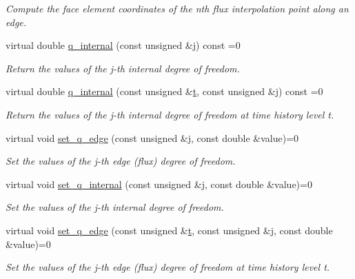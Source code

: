 \begin{DoxyCompactItemize}
\begin{DoxyCompactList}\small\item\em Compute the face element coordinates of the nth flux interpolation point along an edge. \end{DoxyCompactList}\item 
virtual double \hyperlink{classoomph_1_1AxisymmetricPoroelasticityEquations_aa8e09704efd83dcc29b6d10c7d67fd0a}{q\+\_\+internal} (const unsigned \&j) const =0
\begin{DoxyCompactList}\small\item\em Return the values of the j-\/th internal degree of freedom. \end{DoxyCompactList}\item 
virtual double \hyperlink{classoomph_1_1AxisymmetricPoroelasticityEquations_acd7198ede00dbfeacf2bc576b688f54b}{q\+\_\+internal} (const unsigned \&\hyperlink{cfortran_8h_af6f0bd3dc13317f895c91323c25c2b8f}{t}, const unsigned \&j) const =0
\begin{DoxyCompactList}\small\item\em Return the values of the j-\/th internal degree of freedom at time history level t. \end{DoxyCompactList}\item 
virtual void \hyperlink{classoomph_1_1AxisymmetricPoroelasticityEquations_a40f0037981afc44e18425f472e04cb73}{set\+\_\+q\+\_\+edge} (const unsigned \&j, const double \&value)=0
\begin{DoxyCompactList}\small\item\em Set the values of the j-\/th edge (flux) degree of freedom. \end{DoxyCompactList}\item 
virtual void \hyperlink{classoomph_1_1AxisymmetricPoroelasticityEquations_a50d888d78b1115aa95226ddcb34d5969}{set\+\_\+q\+\_\+internal} (const unsigned \&j, const double \&value)=0
\begin{DoxyCompactList}\small\item\em Set the values of the j-\/th internal degree of freedom. \end{DoxyCompactList}\item 
virtual void \hyperlink{classoomph_1_1AxisymmetricPoroelasticityEquations_a30a9883e688ff91b78407b2e42e92d95}{set\+\_\+q\+\_\+edge} (const unsigned \&\hyperlink{cfortran_8h_af6f0bd3dc13317f895c91323c25c2b8f}{t}, const unsigned \&j, const double \&value)=0
\begin{DoxyCompactList}\small\item\em Set the values of the j-\/th edge (flux) degree of freedom at time history level t. \end{DoxyCompactList}\item 

\end{DoxyCompactItemize}
